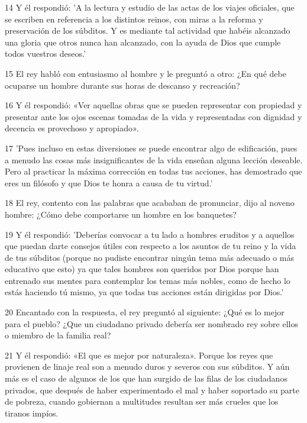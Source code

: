 \par 14 Y él respondió: 'A la lectura y estudio de las actas de los viajes oficiales, que se escriben en referencia a los distintos reinos, con miras a la reforma y preservación de los súbditos. Y es mediante tal actividad que habéis alcanzado una gloria que otros nunca han alcanzado, con la ayuda de Dios que cumple todos vuestros deseos.'

\par 15 El rey habló con entusiasmo al hombre y le preguntó a otro: ¿En qué debe ocuparse un hombre durante sus horas de descanso y recreación?

\par 16 Y él respondió: «Ver aquellas obras que se pueden representar con propiedad y presentar ante los ojos escenas tomadas de la vida y representadas con dignidad y decencia es provechoso y apropiado».

\par 17 'Pues incluso en estas diversiones se puede encontrar algo de edificación, pues a menudo las cosas más insignificantes de la vida enseñan alguna lección deseable. Pero al practicar la máxima corrección en todas tus acciones, has demostrado que eres un filósofo y que Dios te honra a causa de tu virtud.'

\par 18 El rey, contento con las palabras que acababan de pronunciar, dijo al noveno hombre: ¿Cómo debe comportarse un hombre en los banquetes?

\par 19 Y él respondió: 'Deberías convocar a tu lado a hombres eruditos y a aquellos que puedan darte consejos útiles con respecto a los asuntos de tu reino y la vida de tus súbditos (porque no pudiste encontrar ningún tema más adecuado o más educativo que esto) ya que tales hombres son queridos por Dios porque han entrenado sus mentes para contemplar los temas más nobles, como de hecho lo estás haciendo tú mismo, ya que todas tus acciones están dirigidas por Dios.'

\par 20 Encantado con la respuesta, el rey preguntó al siguiente: ¿Qué es lo mejor para el pueblo? ¿Que un ciudadano privado debería ser nombrado rey sobre ellos o miembro de la familia real?

\par 21 Y él respondió: «El que es mejor por naturaleza». Porque los reyes que provienen de linaje real son a menudo duros y severos con sus súbditos. Y aún más es el caso de algunos de los que han surgido de las filas de los ciudadanos privados, que después de haber experimentado el mal y haber soportado su parte de pobreza, cuando gobiernan a multitudes resultan ser más crueles que los tiranos impíos.

